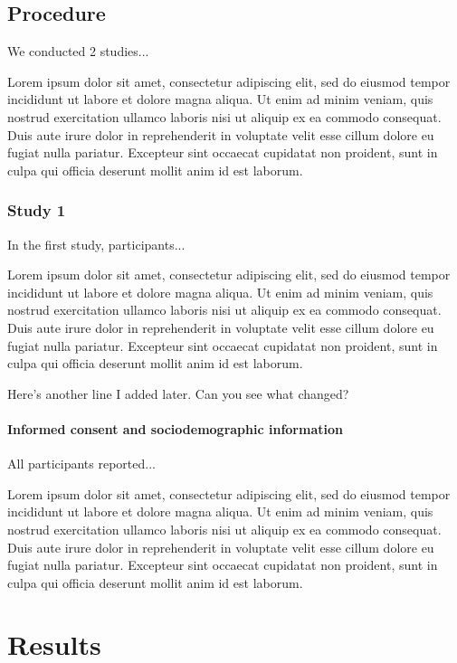 \documentclass[jou, floatsintext, colorlinks=true, linkcolor=blue, citecolor=blue, urlcolor=blue]{apa7} %
\begin{document}
\subsection{Procedure}

We conducted 2 studies...

Lorem ipsum dolor sit amet, consectetur adipiscing elit, sed do eiusmod tempor incididunt ut labore et dolore magna aliqua. Ut enim ad minim veniam, quis nostrud exercitation ullamco laboris nisi ut aliquip ex ea commodo consequat. Duis aute irure dolor in reprehenderit in voluptate velit esse cillum dolore eu fugiat nulla pariatur. Excepteur sint occaecat cupidatat non proident, sunt in culpa qui officia deserunt mollit anim id est laborum.


\subsubsection{Study 1}

In the first study, participants...

Lorem ipsum dolor sit amet, consectetur adipiscing elit, sed do eiusmod tempor incididunt ut labore et dolore magna aliqua. Ut enim ad minim veniam, quis nostrud exercitation ullamco laboris nisi ut aliquip ex ea commodo consequat. Duis aute irure dolor in reprehenderit in voluptate velit esse cillum dolore eu fugiat nulla pariatur. Excepteur sint occaecat cupidatat non proident, sunt in culpa qui officia deserunt mollit anim id est laborum.

Here's another line I added later. Can you see what changed?

\paragraph{Informed consent and sociodemographic information}

All participants reported...

Lorem ipsum dolor sit amet, consectetur adipiscing elit, sed do eiusmod tempor incididunt ut labore et dolore magna aliqua. Ut enim ad minim veniam, quis nostrud exercitation ullamco laboris nisi ut aliquip ex ea commodo consequat. Duis aute irure dolor in reprehenderit in voluptate velit esse cillum dolore eu fugiat nulla pariatur. Excepteur sint occaecat cupidatat non proident, sunt in culpa qui officia deserunt mollit anim id est laborum.

\section{Results}
\end{document}
